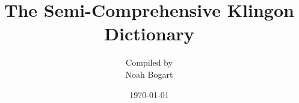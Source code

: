 \documentclass[twocolumn,10pt]{book}
\begin{document}
\title{The Semi-Comprehensive Klingon Dictionary}
\author{\small{Compiled by}\\\normalsize{Noah Bogart}}
\date{\today}
\maketitle

\tableofcontents










































\end{document}
